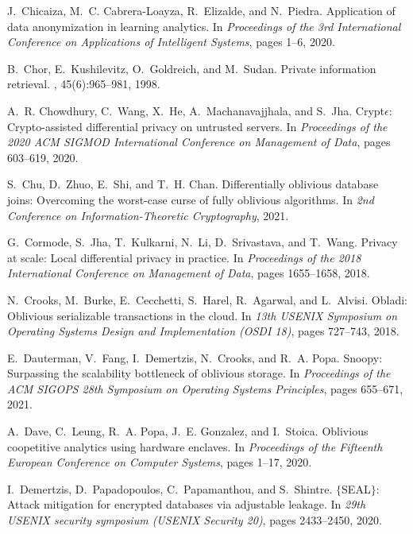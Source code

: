\documentclass[11pt]{article}
\begin{document}
\begin{thebibliography}{140}
\begin{small}
J.~Chicaiza, M.~C. Cabrera-Loayza, R.~Elizalde, and N.~Piedra.
\newblock Application of data anonymization in learning analytics.
\newblock In {\em Proceedings of the 3rd International Conference on
  Applications of Intelligent Systems}, pages 1--6, 2020.

B.~Chor, E.~Kushilevitz, O.~Goldreich, and M.~Sudan.
\newblock Private information retrieval.
, 45(6):965--981, 1998.

A.~R. Chowdhury, C.~Wang, X.~He, A.~Machanavajjhala, and S.~Jha.
\newblock Crypt$\epsilon$: Crypto-assisted differential privacy on untrusted
  servers.
\newblock In {\em Proceedings of the 2020 ACM SIGMOD International Conference
  on Management of Data}, pages 603--619, 2020.

S.~Chu, D.~Zhuo, E.~Shi, and T.~H. Chan.
\newblock Differentially oblivious database joins: Overcoming the worst-case
  curse of fully oblivious algorithms.
\newblock In {\em 2nd Conference on Information-Theoretic Cryptography}, 2021.

G.~Cormode, S.~Jha, T.~Kulkarni, N.~Li, D.~Srivastava, and T.~Wang.
\newblock Privacy at scale: Local differential privacy in practice.
\newblock In {\em Proceedings of the 2018 International Conference on
  Management of Data}, pages 1655--1658, 2018.

N.~Crooks, M.~Burke, E.~Cecchetti, S.~Harel, R.~Agarwal, and L.~Alvisi.
\newblock Obladi: Oblivious serializable transactions in the cloud.
\newblock In {\em 13th USENIX Symposium on Operating Systems Design and
  Implementation (OSDI 18)}, pages 727--743, 2018.

E.~Dauterman, V.~Fang, I.~Demertzis, N.~Crooks, and R.~A. Popa.
\newblock Snoopy: Surpassing the scalability bottleneck of oblivious storage.
\newblock In {\em Proceedings of the ACM SIGOPS 28th Symposium on Operating
  Systems Principles}, pages 655--671, 2021.

A.~Dave, C.~Leung, R.~A. Popa, J.~E. Gonzalez, and I.~Stoica.
\newblock Oblivious coopetitive analytics using hardware enclaves.
\newblock In {\em Proceedings of the Fifteenth European Conference on Computer
  Systems}, pages 1--17, 2020.

I.~Demertzis, D.~Papadopoulos, C.~Papamanthou, and S.~Shintre.
\newblock $\{$SEAL$\}$: Attack mitigation for encrypted databases via
  adjustable leakage.
\newblock In {\em 29th USENIX security symposium (USENIX Security 20)}, pages
  2433--2450, 2020.


\end{small}
\end{thebibliography}
\end{document}
